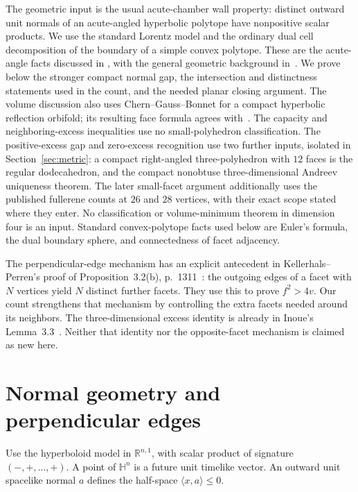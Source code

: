 \documentclass[11pt]{article}
\theoremstyle{remark}
\newcommand{\HH}{\mathbb H}
\newcommand{\ip}[2]{\langle #1,#2\rangle}
\begin{document}
The geometric input is the usual acute-chamber wall property: distinct
outward unit normals of an acute-angled hyperbolic polytope have
nonpositive scalar products. We use the standard Lorentz model and the
ordinary dual cell decomposition of the boundary of a simple convex
polytope. These are the acute-angle facts discussed in
\cite[pp.~63--64 and Proposition~4.1]{PV}, with the general geometric
background in~\cite{AVS}. We prove below the stronger compact normal gap,
the intersection and distinctness statements used in the count, and the
needed planar closing argument. The volume discussion also uses
Chern--Gauss--Bonnet for a compact hyperbolic reflection orbifold; its
resulting face formula agrees with~\cite[Proposition~3.2(d)]{KP}.
The capacity and neighboring-excess inequalities use no small-polyhedron
classification. The positive-excess gap and zero-excess recognition use
two further inputs, isolated in Section~\ref{sec:metric}: a compact
right-angled three-polyhedron with $12$ faces is the regular dodecahedron,
and the compact nonobtuse three-dimensional Andreev uniqueness theorem.
The later small-facet argument additionally uses the published fullerene
counts at $26$ and $28$ vertices, with their exact scope stated where they
enter. No classification or volume-minimum theorem in dimension four is an
input. Standard convex-polytope facts used below are Euler's formula,
the dual boundary sphere, and connectedness of facet adjacency.

The perpendicular-edge mechanism has an explicit antecedent in
Kellerhals--Perren's proof of Proposition~3.2(b), p.~1311~\cite{KP}:
the outgoing edges of a facet with $N$ vertices yield $N$ distinct
further facets. They use this to prove $f^2>4v$. Our count strengthens
that mechanism by controlling the extra facets needed around its
neighbors. The three-dimensional excess identity is already in
Inoue's Lemma~3.3~\cite{Inoue}. Neither that identity nor the
opposite-facet mechanism is claimed as new here.

\section{Normal geometry and perpendicular edges}

Use the hyperboloid model in $\mathbb R^{n,1}$, with scalar product of
signature $(-,+,\ldots,+)$. A point of $\HH^n$ is a future unit timelike
vector. An outward unit spacelike normal $a$ defines the half-space
$\ip{x}{a}\le0$.
\end{document}
